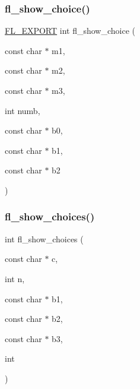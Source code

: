 \mbox{\label{forms_8_h_a8cba2fc83800f0c666050bb0d2248db0}} 
\subsubsection{\texorpdfstring{fl\+\_\+show\+\_\+choice()}{fl\_show\_choice()}}
{\footnotesize\ttfamily \hyperlink{_fl___export_8_h_aa9ba29a18aee9d738370a06eeb4470fc}{F\+L\+\_\+\+E\+X\+P\+O\+RT} int fl\+\_\+show\+\_\+choice (\begin{DoxyParamCaption}\item[{const char $\ast$}]{m1,  }\item[{const char $\ast$}]{m2,  }\item[{const char $\ast$}]{m3,  }\item[{int}]{numb,  }\item[{const char $\ast$}]{b0,  }\item[{const char $\ast$}]{b1,  }\item[{const char $\ast$}]{b2 }\end{DoxyParamCaption})}

\mbox{\label{forms_8_h_ae3dc8cc6513663cdbde440d8afc1e45e}} 
\subsubsection{\texorpdfstring{fl\+\_\+show\+\_\+choices()}{fl\_show\_choices()}}
{\footnotesize\ttfamily int fl\+\_\+show\+\_\+choices (\begin{DoxyParamCaption}\item[{const char $\ast$}]{c,  }\item[{int}]{n,  }\item[{const char $\ast$}]{b1,  }\item[{const char $\ast$}]{b2,  }\item[{const char $\ast$}]{b3,  }\item[{int}]{ }\end{DoxyParamCaption})\hspace{0.3cm}{\ttfamily [inline]}}

\mbox{\label{forms_8_h_a080ed20382b24b31d07903c1368e55f3}} 
